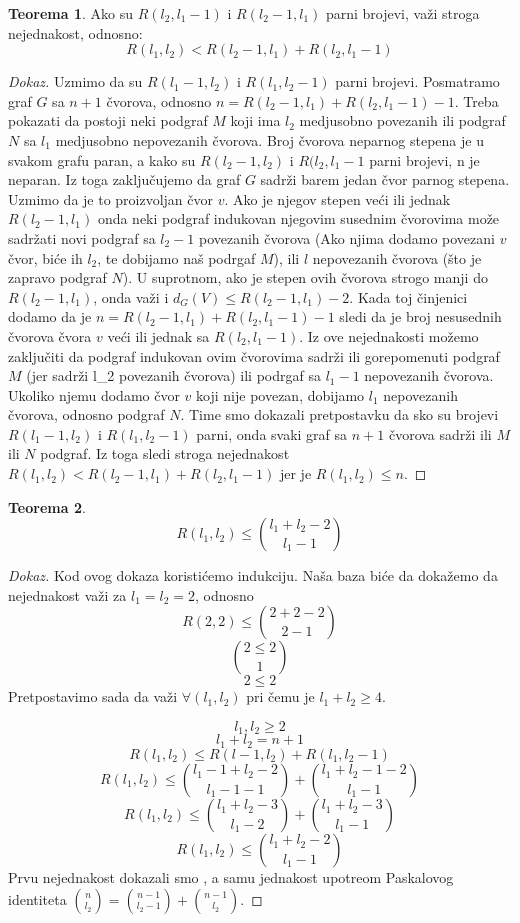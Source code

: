 \documentclass{article}
\theoremstyle{definition}
\newtheorem{teorema}{Teorema}[section]
\newcommand{\dokaz}[1]{\begin{proof}[Dokaz]#1\end{proof}}
\begin{document}
	\begin{teorema}
	Ako su $R(l_2, l_1-1)$ i $R(l_2-1, l_1)$ parni brojevi, važi stroga nejednakost, odnosno: 
	\[
	R(l_1,l_2) < R(l_2-1, l_1) + R(l_2, l_1-1)
	\]
	\end{teorema}
	\dokaz{
	Uzmimo da su $R(l_1-1, l_2)$ i $R(l_1, l_2-1)$ parni brojevi. Posmatramo graf $G$ sa $n+1$ čvorova, odnosno $n=R(l_2-1, l_1)+ R(l_2, l_1-1)-1$.
	Treba pokazati da postoji neki podgraf $M$ koji ima $l_2$ medjusobno povezanih ili podgraf $N$ sa $l_1$ medjusobno nepovezanih čvorova. Broj čvorova neparnog stepena je u svakom grafu paran, a kako su $R(l_2-1, l_2)$ i $R(l_2, l_1-1$ parni brojevi, n je neparan. Iz toga zaključujemo da graf $G$ sadrži barem jedan čvor parnog stepena. Uzmimo da je to proizvoljan čvor $v$. Ako je njegov stepen veći ili jednak $R(l_2-1,l_1)$ onda neki podgraf indukovan njegovim susednim čvorovima može sadržati novi podgraf sa $l_2-1$ povezanih čvorova (Ako njima dodamo povezani $v$ čvor, biće ih $l_2$, te dobijamo naš podrgaf $M$), ili $l$ nepovezanih čvorova (što je zapravo podgraf $N$). 
	\newline
	U suprotnom, ako je stepen ovih čvorova strogo manji do $R(l_2-1,l_1)$, onda važi i $d_G(V) \leq R(l_2-1, l_1)-2$. Kada toj činjenici dodamo da je $n=R(l_2-1, l_1)+ R(l_2, l_1-1)-1$ sledi da je broj nesusednih čvorova čvora $v$ veći ili jednak sa $R(l_2, l_1-1)$. Iz ove nejednakosti možemo zaključiti da podgraf indukovan ovim čvorovima sadrži ili gorepomenuti podgraf $M$ (jer sadrži l_2 povezanih čvorova) ili podrgaf sa $l_1-1$ nepovezanih čvorova. Ukoliko njemu dodamo čvor $v$ koji nije povezan, dobijamo $l_1$ nepovezanih čvorova, odnosno podgraf $N$.
	\newline
	Time smo dokazali pretpostavku da sko su brojevi $R(l_1-1, l_2)$ i $R(l_1, l_2-1)$ parni, onda svaki graf sa $n+1$ čvorova sadrži ili $M$ ili $N$ podgraf. Iz toga sledi stroga nejednakost $R(l_1,l_2) < R(l_2-1, l_1) + R(l_2, l_1-1)$ jer je $R(l_1,l_2) \leq n$. 
	}
 
	


		\begin{teorema}
	\[R(l_1,l_2) \leq {l_1+l_2-2\choose l_1-1} 
	\]
	\end{teorema}
	\dokaz{
	Kod ovog dokaza koristićemo indukciju. Naša baza biće da dokažemo da nejednakost važi za $l_1=l_2=2$, odnosno
	\[ R(2,2) \leq {2+2-2 \choose 2-1}
	\]
	\[
	2 \leq 2 \choose 1
	\]
	\[
	2 \leq 2
	\]
	Pretpostavimo sada da važi $\forall(l_1,l_2)$  pri čemu je $l_1+l_2 \geq 4$.

	\[l_1,l_2 \geq 2
	\]
	\[
	l_1+l_2=n+1
	\]
	\[
	R(l_1,l_2) \leq R(l-1, l_2) + R(l_1, l_2-1)
	\]
	\[
	R(l_1,l_2) \leq {{l_1-1+l_2-2 \choose l_1-1-1} + {l_1+l_2-1-2 \choose l_1-1}}
	\]
	\[
	R(l_1,l_2) \leq {{l_1+l_2-3 \choose l_1-2} + {l_1+l_2-3 \choose l_1-1}}
	\]
	\[
	R(l_1,l_2) \leq {l_1+l_2-2 \choose l_1-1}
	\]
	Prvu nejednakost dokazali smo %
	, a samu jednakost upotreom Paskalovog identiteta ${n \choose l_2} = {n-1 \choose l_2-1} + {n-1 \choose l_2}$.
}
	
\end{document}
